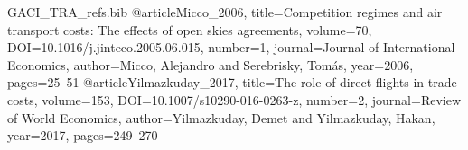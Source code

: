 \begin{filecontents*}[overwrite]{GACI_TRA_refs.bib}
@article{Micco_2006, title={Competition regimes and air transport costs: The effects of open skies agreements}, volume={70}, DOI={10.1016/j.jinteco.2005.06.015}, number={1}, journal={Journal of International Economics}, author={Micco, Alejandro and Serebrisky, Tom\'as}, year={2006}, pages={25--51} }
@article{Yilmazkuday_2017, title={The role of direct flights in trade costs}, volume={153}, DOI={10.1007/s10290-016-0263-z}, number={2}, journal={Review of World Economics}, author={Yilmazkuday, Demet and Yilmazkuday, Hakan}, year={2017}, pages={249--270} }
\end{filecontents*}

\documentclass[review,3p,times]{elsarticle}

\usepackage{lineno,hyperref}
\usepackage{amsmath,amssymb}
\usepackage{graphicx}
\usepackage{booktabs}
\usepackage{threeparttable}
\usepackage{multirow}
\usepackage{url}
\usepackage{float}

\newcommand{\sym}[1]{\ensuremath{^{#1}}}



